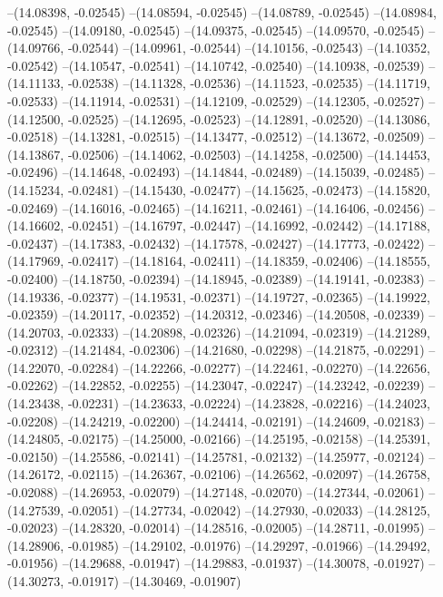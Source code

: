 --(14.08398, -0.02545)
--(14.08594, -0.02545)
--(14.08789, -0.02545)
--(14.08984, -0.02545)
--(14.09180, -0.02545)
--(14.09375, -0.02545)
--(14.09570, -0.02545)
--(14.09766, -0.02544)
--(14.09961, -0.02544)
--(14.10156, -0.02543)
--(14.10352, -0.02542)
--(14.10547, -0.02541)
--(14.10742, -0.02540)
--(14.10938, -0.02539)
--(14.11133, -0.02538)
--(14.11328, -0.02536)
--(14.11523, -0.02535)
--(14.11719, -0.02533)
--(14.11914, -0.02531)
--(14.12109, -0.02529)
--(14.12305, -0.02527)
--(14.12500, -0.02525)
--(14.12695, -0.02523)
--(14.12891, -0.02520)
--(14.13086, -0.02518)
--(14.13281, -0.02515)
--(14.13477, -0.02512)
--(14.13672, -0.02509)
--(14.13867, -0.02506)
--(14.14062, -0.02503)
--(14.14258, -0.02500)
--(14.14453, -0.02496)
--(14.14648, -0.02493)
--(14.14844, -0.02489)
--(14.15039, -0.02485)
--(14.15234, -0.02481)
--(14.15430, -0.02477)
--(14.15625, -0.02473)
--(14.15820, -0.02469)
--(14.16016, -0.02465)
--(14.16211, -0.02461)
--(14.16406, -0.02456)
--(14.16602, -0.02451)
--(14.16797, -0.02447)
--(14.16992, -0.02442)
--(14.17188, -0.02437)
--(14.17383, -0.02432)
--(14.17578, -0.02427)
--(14.17773, -0.02422)
--(14.17969, -0.02417)
--(14.18164, -0.02411)
--(14.18359, -0.02406)
--(14.18555, -0.02400)
--(14.18750, -0.02394)
--(14.18945, -0.02389)
--(14.19141, -0.02383)
--(14.19336, -0.02377)
--(14.19531, -0.02371)
--(14.19727, -0.02365)
--(14.19922, -0.02359)
--(14.20117, -0.02352)
--(14.20312, -0.02346)
--(14.20508, -0.02339)
--(14.20703, -0.02333)
--(14.20898, -0.02326)
--(14.21094, -0.02319)
--(14.21289, -0.02312)
--(14.21484, -0.02306)
--(14.21680, -0.02298)
--(14.21875, -0.02291)
--(14.22070, -0.02284)
--(14.22266, -0.02277)
--(14.22461, -0.02270)
--(14.22656, -0.02262)
--(14.22852, -0.02255)
--(14.23047, -0.02247)
--(14.23242, -0.02239)
--(14.23438, -0.02231)
--(14.23633, -0.02224)
--(14.23828, -0.02216)
--(14.24023, -0.02208)
--(14.24219, -0.02200)
--(14.24414, -0.02191)
--(14.24609, -0.02183)
--(14.24805, -0.02175)
--(14.25000, -0.02166)
--(14.25195, -0.02158)
--(14.25391, -0.02150)
--(14.25586, -0.02141)
--(14.25781, -0.02132)
--(14.25977, -0.02124)
--(14.26172, -0.02115)
--(14.26367, -0.02106)
--(14.26562, -0.02097)
--(14.26758, -0.02088)
--(14.26953, -0.02079)
--(14.27148, -0.02070)
--(14.27344, -0.02061)
--(14.27539, -0.02051)
--(14.27734, -0.02042)
--(14.27930, -0.02033)
--(14.28125, -0.02023)
--(14.28320, -0.02014)
--(14.28516, -0.02005)
--(14.28711, -0.01995)
--(14.28906, -0.01985)
--(14.29102, -0.01976)
--(14.29297, -0.01966)
--(14.29492, -0.01956)
--(14.29688, -0.01947)
--(14.29883, -0.01937)
--(14.30078, -0.01927)
--(14.30273, -0.01917)
--(14.30469, -0.01907)
